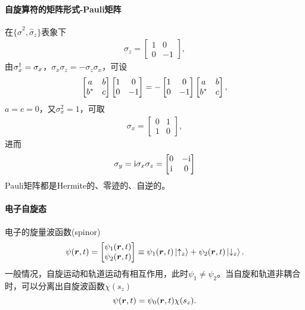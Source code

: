 \paragraph{自旋算符的矩阵形式-Pauli矩阵}在$\{\hat\sigma^2,\hat\sigma_z\}$表象下
\begin{align}
	\sigma_z=\begin{bmatrix}
		1&0\\0&-1
	\end{bmatrix},
\end{align}
由$\sigma_x^\dagger=\sigma_x$，$\sigma_x\sigma_z=-\sigma_z\sigma_x$，可设
\[
	\begin{bmatrix}
	a&b\\b^\ast&c
\end{bmatrix}\begin{bmatrix}
	1&0\\0&-1
\end{bmatrix}=-\begin{bmatrix}
	1&0\\0&-1
\end{bmatrix}\begin{bmatrix}
	a&b\\b^\ast&c
\end{bmatrix},
\]
$a=c=0$，又$\sigma_x^2=1$，可取
\begin{align}
	\sigma_x=\begin{bmatrix}
		0&1\\1&0
	\end{bmatrix},
\end{align}
进而
\begin{align}
	\sigma_y=\mathrm{i}\sigma_x\sigma_z=\begin{bmatrix}
		0&-\mathrm{i}\\\mathrm{i}&0
	\end{bmatrix}
\end{align}
Pauli矩阵都是Hermite的、零迹的、自逆的。
\paragraph{电子自旋态}电子的旋量波函数(spinor)
\[
	\psi(\bm r,t)=\begin{bmatrix}
	\psi_1(\bm r,t)\\\psi_2(\bm r,t)
\end{bmatrix}\equiv\psi_1(\bm r,t)\left\vert \uparrow_z\right\rangle+\psi_2(\bm r,t)\left\vert \downarrow_z\right\rangle.
\]
一般情况，自旋运动和轨道运动有相互作用，此时$\psi_1\neq\psi_2$。当自旋和轨道非耦合时，可以分离出自旋波函数$\chi(s_z)$
\[
	\psi(\bm r,t)=\psi_0(\bm r,t)\chi(s_z).
\]

